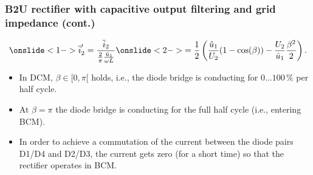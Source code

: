 \begin{frame}
    \frametitle{B2U rectifier with capacitive output filtering and grid impedance (cont.)}
    \begin{equation}
        \onslide<1->{\overline{i}'_2 = \frac{\overline{i}_2}{\frac{2}{\pi}\frac{\hat{u}_1}{\omega L}}} \onslide<2->{= \frac{1}{2} \left(\frac{\hat{u}_1}{U_2}(1-\cos(\beta))-\frac{U_2}{\hat{u}_1}\frac{\beta^2}{2}\right).}
        \label{eq:i2_avg_norm_B2U_cap_filt_grid_DCM}
    \end{equation}

    \begin{itemize}
        \item<3-> In DCM, $\beta \in [0, \pi[$ holds, i.e., the diode bridge is conducting for $0\ldots100 \,\%$ per half cycle.
        \item<4-> At $\beta = \pi$ the diode bridge is conducting for the full half cycle (i.e., entering BCM).
        \item<5-> In order to achieve a commutation of the current between the diode pairs D1/D4 and D2/D3, the current gets zero (for a short time) so that the rectifier operates in BCM. 
    \end{itemize}
\end{frame}

